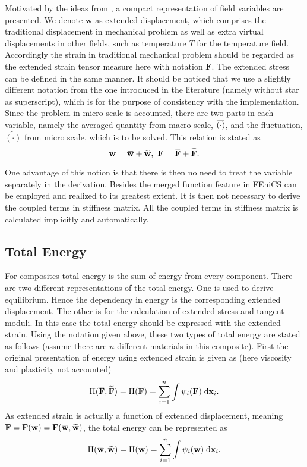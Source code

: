 \documentclass[10pt,a4paper]{scrreprt}
\newcommand{\myd}{\;\mathrm{d}}
\newcommand{\overbar}[1]{\mkern 1.5mu\overline{\mkern-1.5mu#1\mkern-1.5mu}\mkern 1.5mu}
\begin{document}
Motivated by the ideas from \citep{miehe_homogenization_2016}, a compact representation of field variables are presented. We denote $\mathbf{w}$ as extended displacement, which comprises the traditional displacement in mechanical problem as well as extra virtual displacements in other fields, such as temperature $T$ for the temperature field. Accordingly the strain in traditional mechanical problem should be regarded as the extended strain tensor measure here with notation $\mathbf{F}$. The extended stress can be defined in the same manner. It should be noticed that we use a slightly different notation from the one introduced in the literature \citep{miehe_homogenization_2016} (namely without star as superscript), which is for the purpose of consistency with the implementation. Since the problem in micro scale is accounted, there are two parts in each variable, namely the averaged quantity from macro scale, $\overbar{(\cdot)}$, and the fluctuation, $\widetilde{(\cdot)}$ from micro scale, which is to be solved. This relation is stated as
\begin{equation}
\label{eq: decomp}
\mathbf{w} = \overbar{\mathbf{w}} + \widetilde{\mathbf{w}}, \ \mathbf{F} = \overbar{\mathbf{F}} + \widetilde{\mathbf{F}}.
\end{equation}

One advantage of this notion is that there is then no need to treat the variable separately in the derivation. Besides the merged function feature in FEniCS can be employed and realized to its greatest extent. It is then not necessary to derive the coupled terms in stiffness matrix. All the coupled terms in stiffness matrix is calculated implicitly and automatically.

\subsection{Total Energy}
For composites total energy is the sum of energy from every component. There are two different representations of the total energy. One is used to derive equilibrium. Hence the dependency in energy is the corresponding extended displacement. The other is for the calculation of extended stress and tangent moduli. In this case the total energy should be expressed with the extended strain. Using the notation given above, these two types of total energy are stated as follows (assume there are $n$ different materials in this composite). First the original presentation of energy using extended strain is given as (here viscosity and plasticity not accounted) 
\begin{equation}
\label{eq: strain energy}
\Pi(\overbar{\mathbf{F}}, \widetilde{\mathbf{F}}) = \Pi(\mathbf{F}) = \sum^{n}_{i=1} \int \psi_{i}(\mathbf{F}) \myd{\mathbf{x}_{i}}.
\end{equation}
As extended strain is actually a function of extended displacement, meaning $\mathbf{F}=\mathbf{F}(\mathbf{w})=\mathbf{F}(\overbar{\mathbf{w}}, \widetilde{\mathbf{w}})$, the total energy can be represented as
\begin{equation}
\label{eq: disp energy}
\Pi(\overbar{\mathbf{w}}, \widetilde{\mathbf{w}}) = \Pi(\mathbf{w}) = \sum^{n}_{i=1} \int \psi_{i}(\mathbf{w}) \myd{\mathbf{x}_{i}}.
\end{equation} 
\end{document}
